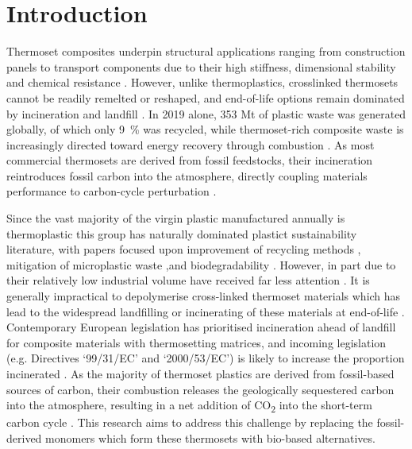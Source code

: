\section{Introduction}
Thermoset composites underpin structural applications ranging from
 construction panels to transport components due to their high stiffness,
 dimensional stability and chemical resistance \autocite{Gilbert2017}.
However, unlike thermoplastics, crosslinked thermosets cannot be readily
 remelted or reshaped, and end-of-life options remain dominated by
 incineration and landfill \autocite{OWID202507121456}.
In 2019 alone, 353 Mt of plastic waste was generated
 globally, of which only 9~\unit{\percent} was recycled, while 
 thermoset-rich composite waste is increasingly directed toward energy
 recovery through combustion \autocite{OWID202507121456}.
As most commercial thermosets are derived from fossil 
 feedstocks, their incineration reintroduces fossil carbon into the 
 atmosphere, directly coupling materials performance to carbon-cycle 
 perturbation \autocite{Eriksson2009}.

Since the vast majority of the virgin plastic manufactured annually
 is thermoplastic this group has naturally dominated plastict 
 sustainability literature, with papers focused upon improvement of 
 recycling methods \autocite{Jagadeesh2022}, mitigation of microplastic 
 waste \autocite{Nafea2024},and biodegradability \autocite{Moshood2022}.
However, in part due to their relatively low industrial volume have
 received far less attention \autocite{Liu2021}.
It is generally impractical to depolymerise cross-linked thermoset
 materials which has lead to the widespread landfilling
 or incinerating of these materials at end-of-life
 \autocite{Utekar2021,Chen2023,Topham2019}.
Contemporary European legislation has prioritised incineration ahead
 of landfill for composite materials with thermosetting matrices, 
 and incoming legislation (e.g. Directives `99/31/EC' and 
 `2000/53/EC') is likely to increase the proportion incinerated
 \autocite{Pickering2006}.
As the majority of thermoset plastics are derived from fossil-based
 sources of carbon, their combustion releases the geologically 
 sequestered carbon into the atmosphere, resulting in a net addition
 of CO\textsubscript{2} into the short-term carbon cycle 
 \autocite{Levi2018}.
This research aims to address this challenge by replacing the 
 fossil-derived monomers which form these thermosets with bio-based
 alternatives.

